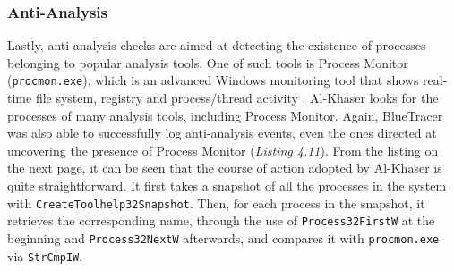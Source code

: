 \subsubsection{Anti-Analysis}

\iffalse
Check for processes of common anti-analysis tools
\fi

Lastly, anti-analysis checks are aimed at detecting the existence of processes belonging to popular analysis tools. One of such tools is Process Monitor (\texttt{procmon.exe}), which is an advanced Windows monitoring tool that shows real-time file system, registry and process/thread activity \cite{procmon}. Al-Khaser looks for the processes of many analysis tools, including Process Monitor. Again, BlueTracer was also able to successfully log anti-analysis events, even the ones directed at uncovering the presence of Process Monitor (\textit{Listing 4.11}). From the listing on the next page, it can be seen that the course of action adopted by Al-Khaser is quite straightforward. It first takes a snapshot of all the processes in the system with \texttt{CreateToolhelp32Snapshot}. Then, for each process in the snapshot, it retrieves the corresponding name, through the use of \texttt{Process32FirstW} at the beginning and \texttt{Process32NextW} afterwards, and compares it with \texttt{procmon.exe} via \texttt{StrCmpIW}. 
\newpage
{}
